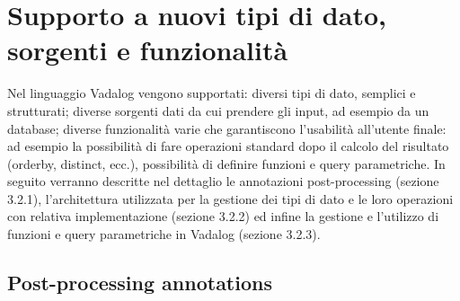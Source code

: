 \section{Supporto a nuovi tipi di dato, sorgenti e funzionalità}

Nel linguaggio Vadalog vengono supportati: diversi tipi di dato, semplici e strutturati; diverse sorgenti dati da cui prendere gli input, ad esempio da un database; diverse funzionalità varie che garantiscono l'usabilità all'utente finale: ad esempio la possibilità di fare operazioni standard dopo il calcolo del risultato (orderby, distinct, ecc.), possibilità di definire funzioni e query parametriche. \newline
In seguito verranno descritte nel dettaglio le annotazioni post-processing (sezione 3.2.1), l'architettura utilizzata per la gestione dei tipi di dato e le loro operazioni con relativa implementazione (sezione 3.2.2) ed infine la gestione e l'utilizzo di funzioni e query parametriche in Vadalog (sezione 3.2.3).

\subsection{Post-processing annotations}

